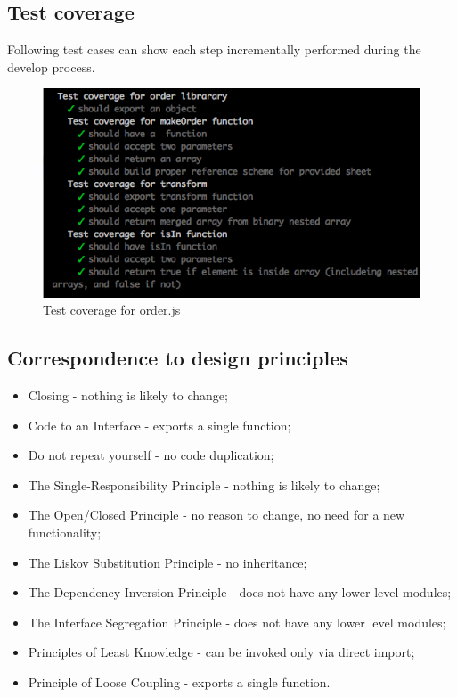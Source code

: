 \subsection{Test coverage}

Following test cases can show each step incrementally performed during the develop process.
\begin{figure}[H]
	\centering
	\includegraphics[width=\linewidth]{grafiken/testOrder.png}
	\caption{Test coverage for order.js}
	\label{fig:testOrder}
\end{figure}

\subsection{Correspondence to design principles}
\begin{itemize}
	\item Closing - nothing is likely to change;
	\item Code to an Interface - exports a single function;
	\item Do not repeat yourself - no code duplication;
	\item The Single-Responsibility Principle - nothing is likely to change;
	\item The Open/Closed Principle - no reason to change, no need for a new functionality;
	\item The Liskov Substitution Principle - no inheritance;
	\item The Dependency-Inversion Principle - does not have any lower level modules;
	\item The Interface Segregation Principle - does not have any lower level modules;
	\item Principles of Least Knowledge -  can be invoked only via direct import;
	\item Principle of Loose Coupling - exports a single function.
\end{itemize}

